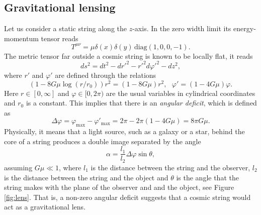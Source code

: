 \subsection{Gravitational lensing}
Let us consider a static string along the $z$-axis. In the zero width limit its energy-momentum tensor reads
\begin{equation}
	T^{\mu\nu} = \mu\delta(x)\delta(y)\,\text{diag}(1,0,0,-1).
	\label{eq:energytensor}
\end{equation}
The metric tensor far outside a cosmic string is known to be locally flat, it reads
\begin{equation}
	ds^2 = dt^2-dr'^2-r'^2d\varphi'^2-dz^2,
	\label{eq:metric}
\end{equation}
where $r'$ and $\varphi'$ are defined through the relations 
\begin{equation}
(1-8G\mu\log(r/r_0))r^2 = (1-8G\mu)r^2, \ \ \ \varphi' = (1-4G\mu)\varphi.
\end{equation}
Here $r\in [0,\infty] $ and $\varphi\in[0,2\pi)$ are the usual variables in cylindrical co\-or\-di\-nates and $r_0$ is a constant. This implies that there is an \textit{angular deficit}, which is defined as 
\begin{equation}
\Delta \varphi = \varphi_{\text{max}} - \varphi'_{\text{max}} = 2\pi -2\pi(1-4G\mu) = 8\pi G\mu.
\end{equation}
Physically, it means that a light source, such as a galaxy or a star, behind the core of a string produces a double image separated by the angle 
\begin{equation}
	\alpha = \frac{l_1}{l_2}\Delta\varphi\sin\theta,
\end{equation}
assuming $G\mu\ll 1$, where $l_1$ is the distance between the string and the observer, $l_2$ is the distance between the string and the object and $\theta$ is the angle that the string makes with the plane of the observer and and the object, see Figure \ref{fig:lens}. That is, a non-zero angular deficit suggests that a cosmic string would act as a gravitational lens.

